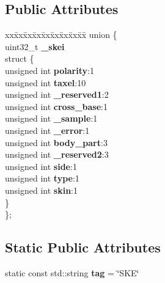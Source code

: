 \subsection*{Public Attributes}
\begin{DoxyCompactItemize}
\item 
\mbox{\label{classev_1_1SkinEvent_afb407a5519d25f22eb740e6ea63e59b9}} 
\begin{tabbing}
xx\=xx\=xx\=xx\=xx\=xx\=xx\=xx\=xx\=\kill
union \{\\
\>uint32\_t {\bfseries \_skei}\\
\mbox{\label{unionev_1_1SkinEvent_1_1_0D5_a8200e9dff378e05d18f6e37dd77ab9a0}} 
\>struct \{\\
\>\>unsigned int {\bfseries polarity}:1\\
\>\>unsigned int {\bfseries taxel}:10\\
\>\>unsigned int {\bfseries \_reserved1}:2\\
\>\>unsigned int {\bfseries cross\_base}:1\\
\>\>unsigned int {\bfseries \_sample}:1\\
\>\>unsigned int {\bfseries \_error}:1\\
\>\>unsigned int {\bfseries body\_part}:3\\
\>\>unsigned int {\bfseries \_reserved2}:3\\
\>\>unsigned int {\bfseries side}:1\\
\>\>unsigned int {\bfseries type}:1\\
\>\>unsigned int {\bfseries skin}:1\\
\>\} \\
\}; \\

\end{tabbing}\end{DoxyCompactItemize}
\subsection*{Static Public Attributes}
\begin{DoxyCompactItemize}
\item 
\mbox{\label{classev_1_1SkinEvent_a04891c06417b71a75dc0d4d377301aa5}} 
static const std\+::string {\bfseries tag} = \char`\"{}S\+KE\char`\"{}
\end{DoxyCompactItemize}



